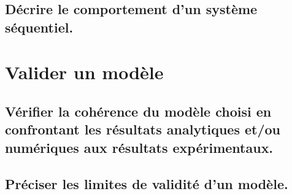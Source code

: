 \documentclass[10pt,fleqn]{book}
\newcommand{\repRel}{../..}
\newcommand{\repStyle}{\repRel/Style}
\newcommand{\td}{fichier_td}
\newcommand{\repExos}{\repRel/ExercicesCompetences}
\newcommand{\repExo}{dossier}
\begin{document}
\renewcommand{\repExo}{\repExos/B2_ProposerModele/B2_16_Hyperstatisme/71_Robovolc}
\renewcommand{\td}{71_Robovolc}
\graphicspath{{\repStyle/png/}{\repExo/images/}}


\renewcommand{\repExo}{\repExos/B2_ProposerModele/B2_16_Hyperstatisme/71_Robovolc_02}
\renewcommand{\td}{71_Robovolc_02}
\graphicspath{{\repStyle/png/}{\repExo/images/}}


\renewcommand{\repExo}{\repExos/B2_ProposerModele/B2_16_Hyperstatisme/72_Tripteor}
\renewcommand{\td}{72_Tripteor}
\graphicspath{{\repStyle/png/}{\repExo/images/}}


\renewcommand{\repExo}{\repExos/B2_ProposerModele/B2_16_Hyperstatisme/81_Piaggio}
\renewcommand{\td}{81_Piaggio}
\graphicspath{{\repStyle/png/}{\repExo/images/}}


\renewcommand{\repExo}{\repExos/B2_ProposerModele/B2_16_Hyperstatisme/82_MAV}
\renewcommand{\td}{82_MAV}
\graphicspath{{\repStyle/png/}{\repExo/images/}}


\renewcommand{\repExo}{\repExos/B2_ProposerModele/B2_16_Hyperstatisme/83_Roburoc}
\renewcommand{\td}{79_Roburoc}
\graphicspath{{\repStyle/png/}{\repExo/images/}}


\subsection{Décrire le comportement d'un système séquentiel.} 

\renewcommand{\repExo}{\repExos/B2_ProposerModele/B2_17_Sequentiel/50_BancBalafre}
\renewcommand{\td}{50_BancBalafre}
\graphicspath{{\repStyle/png/}{\repExo/images/}}


\section{Valider un modèle} 

\subsection{Vérifier la cohérence du modèle choisi en confrontant les résultats analytiques et/ou numériques aux résultats expérimentaux.} 

\subsection{Préciser les limites de validité d'un modèle.} 
\end{document}
